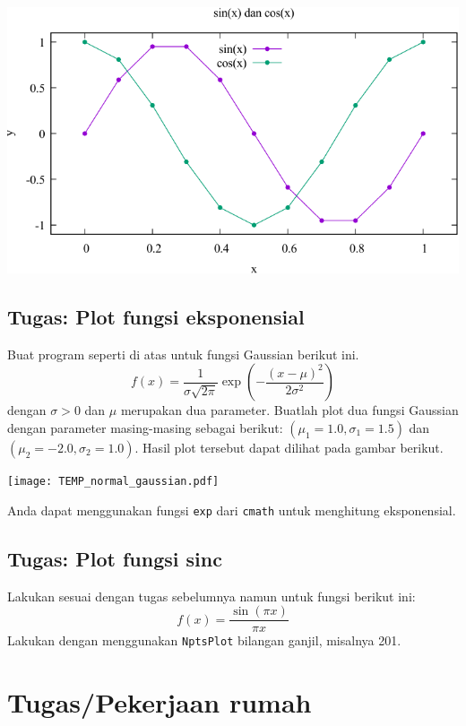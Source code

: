 \documentclass[a4paper,11pt]{extarticle}
\begin{document}
{\centering
\includegraphics[scale=1.0]{sin_cos.pdf}
\par
}


\subsection{Tugas: Plot fungsi eksponensial}

Buat program seperti di atas untuk fungsi Gaussian berikut ini.
\begin{equation}
f(x) = \frac{1}{\sigma\sqrt{2\pi}}\exp\left(-\frac{(x-\mu)^2}{2\sigma^2}\right)
\end{equation}
dengan $\sigma > 0$ dan $\mu$ merupakan dua parameter.
Buatlah plot dua fungsi Gaussian
dengan parameter masing-masing sebagai berikut:
$(\mu_{1}=1.0,\sigma_{1}=1.5)$ dan $(\mu_{2}=-2.0,\sigma_{2}=1.0)$.
Hasil plot tersebut dapat dilihat pada gambar berikut.

{\centering
\texttt{[image: TEMP\_normal\_gaussian.pdf]}
\par}

Anda dapat menggunakan fungsi \texttt{exp} dari \texttt{cmath}
untuk menghitung eksponensial.

\subsection{Tugas: Plot fungsi sinc}
Lakukan sesuai dengan tugas sebelumnya namun untuk fungsi berikut ini:
\begin{equation}
f(x) = \frac{\sin(\pi x)}{\pi x}
\end{equation}
Lakukan dengan menggunakan \texttt{NptsPlot} bilangan ganjil, misalnya 201.

\section{Tugas/Pekerjaan rumah}
\end{document}
